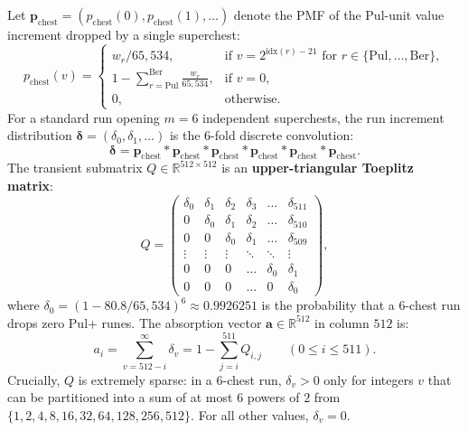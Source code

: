 \documentclass[11pt,reqno]{amsart}
\theoremstyle{definition}
\begin{document}
Let $\mathbf{p}_{\text{chest}} = (p_{\text{chest}}(0), p_{\text{chest}}(1), \dots)$ denote the PMF of the Pul-unit value increment dropped by a single superchest:
\[
    p_{\text{chest}}(v) = \begin{cases}
        w_r / 65{,}534, & \text{if } v = 2^{\text{idx}(r) - 21} \text{ for } r \in \{\text{Pul}, \dots, \text{Ber}\}, \\
        1 - \sum_{r=\text{Pul}}^{\text{Ber}} \frac{w_r}{65{,}534}, & \text{if } v = 0, \\
        0, & \text{otherwise}.
    \end{cases}
\]
For a standard run opening $m = 6$ independent superchests, the run increment distribution $\boldsymbol{\delta} = (\delta_0, \delta_1, \dots)$ is the $6$-fold discrete convolution:
\begin{equation}
    \boldsymbol{\delta} = \mathbf{p}_{\text{chest}} \ast \mathbf{p}_{\text{chest}} \ast \mathbf{p}_{\text{chest}} \ast \mathbf{p}_{\text{chest}} \ast \mathbf{p}_{\text{chest}} \ast \mathbf{p}_{\text{chest}}.
\end{equation}
The transient submatrix $Q \in \mathbb{R}^{512 \times 512}$ is an \textbf{upper-triangular Toeplitz matrix}:
\begin{equation}
    Q = \begin{pmatrix}
        \delta_0 & \delta_1 & \delta_2 & \delta_3 & \dots & \delta_{511} \\
        0 & \delta_0 & \delta_1 & \delta_2 & \dots & \delta_{510} \\
        0 & 0 & \delta_0 & \delta_1 & \dots & \delta_{509} \\
        \vdots & \vdots & \vdots & \ddots & \ddots & \vdots \\
        0 & 0 & 0 & \dots & \delta_0 & \delta_1 \\
        0 & 0 & 0 & \dots & 0 & \delta_0
    \end{pmatrix},
\end{equation}
where $\delta_0 = (1 - 80.8/65{,}534)^6 \approx 0.9926251$ is the probability that a $6$-chest run drops zero Pul+ runes. The absorption vector $\mathbf{a} \in \mathbb{R}^{512}$ in column $512$ is:
\begin{equation}
    a_i = \sum_{v = 512 - i}^{\infty} \delta_v = 1 - \sum_{j=i}^{511} Q_{i,j} \qquad (0 \le i \le 511).
\end{equation}
Crucially, $Q$ is extremely sparse: in a $6$-chest run, $\delta_v > 0$ only for integers $v$ that can be partitioned into a sum of at most $6$ powers of $2$ from $\{1, 2, 4, 8, 16, 32, 64, 128, 256, 512\}$. For all other values, $\delta_v = 0$.
\end{document}
